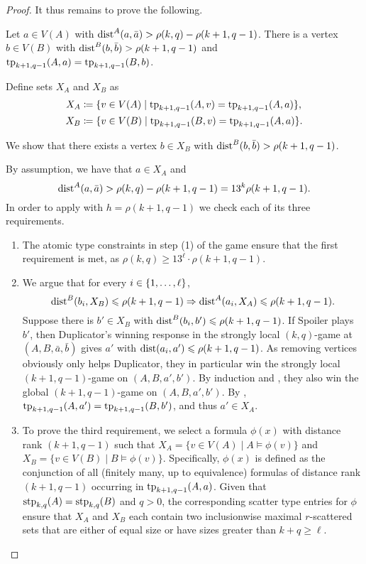 \begin{proof}
\bigskip
    It thus remains to prove the following.


    \begin{claim}\label{claim:farsimilarvertex}
    Let \(a \in V(A)\) with \(\mathrm{dist}^A(a,\bar a) > \rho(k,q)-\rho(k+1,q-1)\).
    There is a vertex \(b\in V(B)\) with \(\mathrm{dist}^B(b,\bar b) > \rho(k+1,q-1)\)
    and $\textnormal{tp}_{k+1,q-1}(A,a)=
\textnormal{tp}_{k+1,q-1}(B,b)$.
    \end{claim}
    \begin{claimproof}
    Define sets \(X_A\) and \(X_B\) as
    \begin{align*}
         X_A &\coloneqq  \{ v \in V(A) \mid \textnormal{tp}_{k+1,q-1}(A,v) = \textnormal{tp}_{k+1,q-1}(A,a)\}, \\
         X_B &\coloneqq  \{ v \in V(B) \mid \textnormal{tp}_{k+1,q-1}(B,v) = \textnormal{tp}_{k+1,q-1}(A,a)\}.
    \end{align*}

\noindent 
We show that there exists a vertex  \(b\in X_B\) with $\mathrm{dist}^B(b,\bar b)>\rho(k+1,q-1)$.


By assumption, we have that 
    \(a \in X_A\) and \[\mathrm{dist}^A(a,\bar a) > \rho(k,q)-\rho(k+1,q-1) = 13^{k} \rho(k+1,q-1).\]
    In order to apply  with \(h = \rho(k+1,q-1)\)
    we check each of its three requirements.
    \begin{enumerate}
        \item The atomic type constraints in step (1) of the game ensure that the first requirement is met, as $\rho(k,q)\ge 13^\ell\cdot\rho(k+1,q-1)$.
        \item We argue that for every \(i\in\{1,\ldots,\ell\}\),
            \[
                \mathrm{dist}^B(b_i,X_B) \leqslant \rho(k+1,q-1) \Rightarrow \mathrm{dist}^A(a_i,X_A) \leqslant \rho(k+1,q-1).
            \]
            Suppose there is $b'\in X_B$ with $\mathrm{dist}^B(b_i,b')\leqslant \rho(k+1,q-1)$.
            If Spoiler plays \(b'\),
            then Duplicator's winning response in the strongly local \((k,q)\)-game 
            at \((A,B,\bar a,\bar b)\) gives \(a'\) with \(\mathrm{dist}(a_i,a') \leqslant \rho(k+1,q-1)\).
            As removing vertices obviously only helps Duplicator,
            they in particular win the strongly local \((k+1,q-1)\)-game on \((A,B,a',b')\).
            By induction and , they also win the global \((k+1,q-1)\)-game on \((A,B,a',b')\).
            By , \(\textnormal{tp}_{k+1,q-1}(A,a') = \textnormal{tp}_{k+1,q-1}(B,b')\), and thus \(a' \in X_A\).
        \item 
            To prove the third requirement, we select a formula \(\phi(x)\) with distance rank \((k+1, q-1)\) such that
            \(X_A = \{ v \in V(A) \mid A \models \phi(v)\}\) and \(X_B = \{ v \in V(B) \mid
            B \models \phi(v)\}\). Specifically, \(\phi(x)\) is defined as the
            conjunction of all (finitely many, up to equivalence) formulas of distance rank \((k+1, q-1)\) occurring in \(\textnormal{tp}_{k+1, q-1}(A, a)\). Given that \(\textnormal{stp}_{k, q}(A) = \textnormal{stp}_{k, q}(B)\) and \(q > 0\),
            the corresponding scatter type entries for \(\phi\) ensure that \(X_A\) and \(X_B\)
            each contain two inclusionwise maximal \(r\)-scattered sets that are either of
            equal size or have sizes greater than \(k+q \ge \ell\).


\end{enumerate}
\end{claimproof}
\end{proof}
